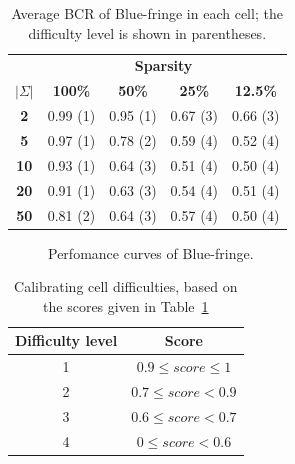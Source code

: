 \begin{table}
\begin{center}
\begin{tabular}{c|c c c c}
&\multicolumn{4}{|c}{\textbf{Sparsity}}\\ 
\textbf{$|\Sigma|$} & \textbf{100\%} & \textbf{50\%} & \textbf{25\%} & \textbf{12.5\%}\\
\hline
\textbf{2}  & 0.99 (1) & 0.95 (1) & 0.67 (3) & 0.66 (3)\\
\textbf{5}  & 0.97 (1) & 0.78 (2) & 0.59 (4) & 0.52 (4)\\
\textbf{10} & 0.93 (1) & 0.64 (3) & 0.51 (4) & 0.50 (4)\\
\textbf{20} & 0.91 (1) & 0.63 (3) & 0.54 (4) & 0.51 (4)\\
\textbf{50} & 0.81 (2) & 0.64 (3) & 0.57 (4) & 0.50 (4)\\
\end{tabular}
\end{center}
\caption{Average BCR of Blue-fringe in each cell; the difficulty level is shown in parentheses.\label{stamina:table:baseline}}
\end{table}

\begin{figure}
\centering{}
  \caption{Perfomance curves of Blue-fringe\label{stamina:image:bluefringe-performance}.}
\end{figure}

\begin{table}
\begin{center}
\begin{tabular}{c|c}
Difficulty level & Score\\
\hline
1&$0.9 \leq score \leq 1$\\
2&$0.7 \leq score < 0.9$\\
3&$0.6 \leq score < 0.7$\\
4&$0 \leq score < 0.6$\\
\end{tabular}
\end{center}
\caption{\label{stamina:table:calibration}Calibrating cell difficulties, based on the scores given in Table~\ref{stamina:table:baseline}}
\end{table}

